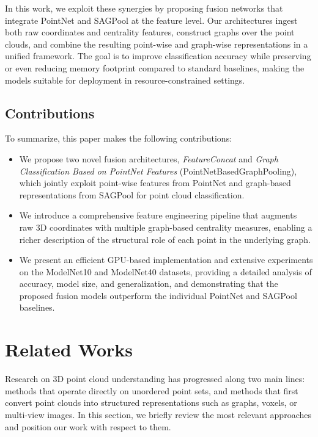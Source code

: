 \documentclass[conference]{IEEEtran}
\begin{document}
In this work, we exploit these synergies by proposing fusion networks that integrate PointNet and SAGPool at the feature level. Our architectures ingest both raw coordinates and centrality features, construct graphs over the point clouds, and combine the resulting point-wise and graph-wise representations in a unified framework. The goal is to improve classification accuracy while preserving or even reducing memory footprint compared to standard baselines, making the models suitable for deployment in resource-constrained settings.

\subsection{Contributions}

To summarize, this paper makes the following contributions:
\begin{itemize}
  \item We propose two novel fusion architectures, \emph{FeatureConcat} and \emph{Graph Classification Based on PointNet Features} (PointNetBasedGraphPooling), which jointly exploit point-wise features from PointNet and graph-based representations from SAGPool for point cloud classification.
  \item We introduce a comprehensive feature engineering pipeline that augments raw 3D coordinates with multiple graph-based centrality measures, enabling a richer description of the structural role of each point in the underlying graph.
  \item We present an efficient GPU-based implementation and extensive experiments on the ModelNet10 and ModelNet40 datasets, providing a detailed analysis of accuracy, model size, and generalization, and demonstrating that the proposed fusion models outperform the individual PointNet and SAGPool baselines.
\end{itemize}


\section{Related Works}

Research on 3D point cloud understanding has progressed along two main lines:
methods that operate directly on unordered point sets, and methods that first
convert point clouds into structured representations such as graphs, voxels, or
multi-view images. In this section, we briefly review the most relevant
approaches and position our work with respect to them.
\end{document}
